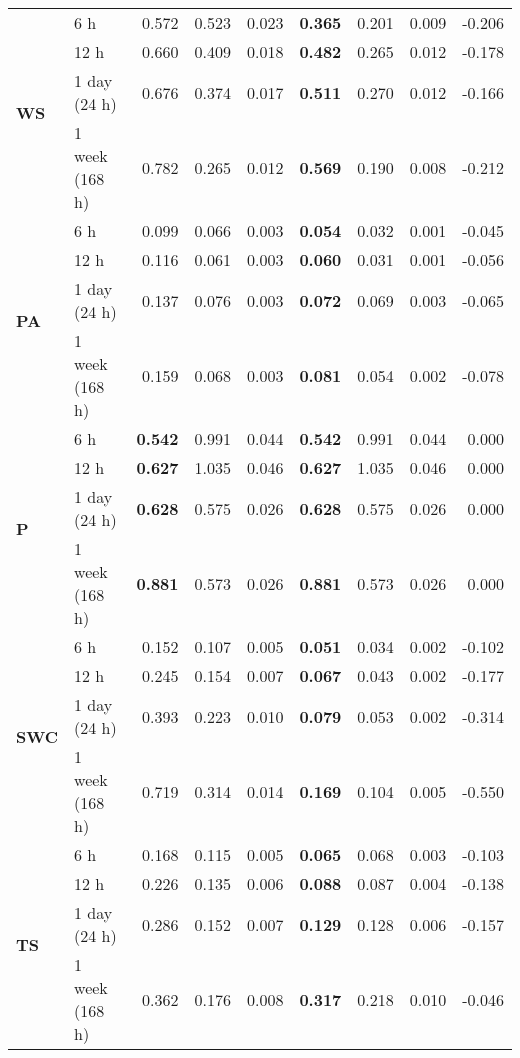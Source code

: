 \begin{table}
\begin{tabular}{p{2.1cm}l|rrr|rrr|r}
\cline{1-9}
\multirow[c]{4}{*}{\textbf{WS}} & 6 h & 0.572 & 0.523 & 0.023 & \bfseries 0.365 & 0.201 & 0.009 & -0.206 \\
 & 12 h & 0.660 & 0.409 & 0.018 & \bfseries 0.482 & 0.265 & 0.012 & -0.178 \\
 & 1 day (24 h) & 0.676 & 0.374 & 0.017 & \bfseries 0.511 & 0.270 & 0.012 & -0.166 \\
 & 1 week (168 h) & 0.782 & 0.265 & 0.012 & \bfseries 0.569 & 0.190 & 0.008 & -0.212 \\
\cline{1-9}
\multirow[c]{4}{*}{\textbf{PA}} & 6 h & 0.099 & 0.066 & 0.003 & \bfseries 0.054 & 0.032 & 0.001 & -0.045 \\
 & 12 h & 0.116 & 0.061 & 0.003 & \bfseries 0.060 & 0.031 & 0.001 & -0.056 \\
 & 1 day (24 h) & 0.137 & 0.076 & 0.003 & \bfseries 0.072 & 0.069 & 0.003 & -0.065 \\
 & 1 week (168 h) & 0.159 & 0.068 & 0.003 & \bfseries 0.081 & 0.054 & 0.002 & -0.078 \\
\cline{1-9}
\multirow[c]{4}{*}{\textbf{P}} & 6 h & \bfseries 0.542 & 0.991 & 0.044 & \bfseries 0.542 & 0.991 & 0.044 & 0.000 \\
 & 12 h & \bfseries 0.627 & 1.035 & 0.046 & \bfseries 0.627 & 1.035 & 0.046 & 0.000 \\
 & 1 day (24 h) & \bfseries 0.628 & 0.575 & 0.026 & \bfseries 0.628 & 0.575 & 0.026 & 0.000 \\
 & 1 week (168 h) & \bfseries 0.881 & 0.573 & 0.026 & \bfseries 0.881 & 0.573 & 0.026 & 0.000 \\
\cline{1-9}
\multirow[c]{4}{*}{\textbf{SWC}} & 6 h & 0.152 & 0.107 & 0.005 & \bfseries 0.051 & 0.034 & 0.002 & -0.102 \\
 & 12 h & 0.245 & 0.154 & 0.007 & \bfseries 0.067 & 0.043 & 0.002 & -0.177 \\
 & 1 day (24 h) & 0.393 & 0.223 & 0.010 & \bfseries 0.079 & 0.053 & 0.002 & -0.314 \\
 & 1 week (168 h) & 0.719 & 0.314 & 0.014 & \bfseries 0.169 & 0.104 & 0.005 & -0.550 \\
\cline{1-9}
\multirow[c]{4}{*}{\textbf{TS}} & 6 h & 0.168 & 0.115 & 0.005 & \bfseries 0.065 & 0.068 & 0.003 & -0.103 \\
 & 12 h & 0.226 & 0.135 & 0.006 & \bfseries 0.088 & 0.087 & 0.004 & -0.138 \\
 & 1 day (24 h) & 0.286 & 0.152 & 0.007 & \bfseries 0.129 & 0.128 & 0.006 & -0.157 \\
 & 1 week (168 h) & 0.362 & 0.176 & 0.008 & \bfseries 0.317 & 0.218 & 0.010 & -0.046 \\
\cline{1-9}
\bottomrule
\end{tabular}
\end{table}
